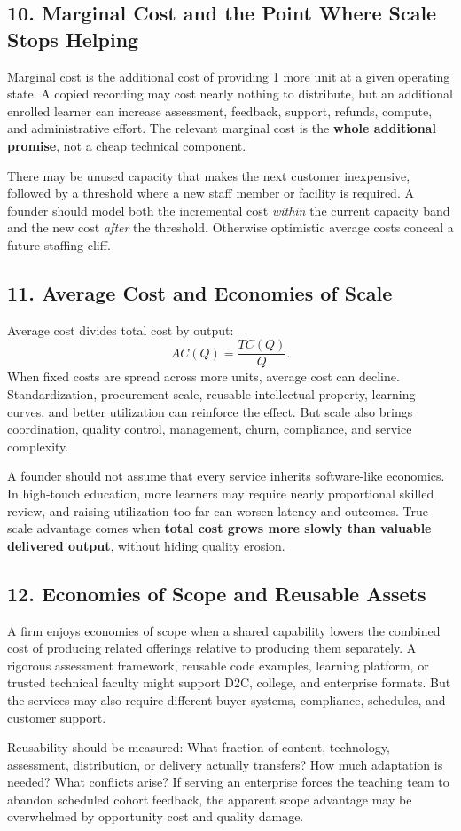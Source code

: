 \subsection*{10. Marginal Cost and the Point Where Scale Stops Helping}

Marginal cost is the additional cost of providing 1 more unit at a given operating state. A copied recording may cost nearly nothing to distribute, but an additional enrolled learner can increase assessment, feedback, support, refunds, compute, and administrative effort. The relevant marginal cost is the \textbf{whole additional promise}, not a cheap technical component.

There may be unused capacity that makes the next customer inexpensive, followed by a threshold where a new staff member or facility is required. A founder should model both the incremental cost \emph{within} the current capacity band and the new cost \emph{after} the threshold. Otherwise optimistic average costs conceal a future staffing cliff.

\subsection*{11. Average Cost and Economies of Scale}

Average cost divides total cost by output:
\begin{equation}
AC(Q) = \frac{TC(Q)}{Q}.
\end{equation}
When fixed costs are spread across more units, average cost can decline. Standardization, procurement scale, reusable intellectual property, learning curves, and better utilization can reinforce the effect. But scale also brings coordination, quality control, management, churn, compliance, and service complexity.

A founder should not assume that every service inherits software-like economics. In high-touch education, more learners may require nearly proportional skilled review, and raising utilization too far can worsen latency and outcomes. True scale advantage comes when \textbf{total cost grows more slowly than valuable delivered output}, without hiding quality erosion.

\subsection*{12. Economies of Scope and Reusable Assets}

A firm enjoys economies of scope when a shared capability lowers the combined cost of producing related offerings relative to producing them separately. A rigorous assessment framework, reusable code examples, learning platform, or trusted technical faculty might support D2C, college, and enterprise formats. But the services may also require different buyer systems, compliance, schedules, and customer support.

Reusability should be measured: What fraction of content, technology, assessment, distribution, or delivery actually transfers? How much adaptation is needed? What conflicts arise? If serving an enterprise forces the teaching team to abandon scheduled cohort feedback, the apparent scope advantage may be overwhelmed by opportunity cost and quality damage.

